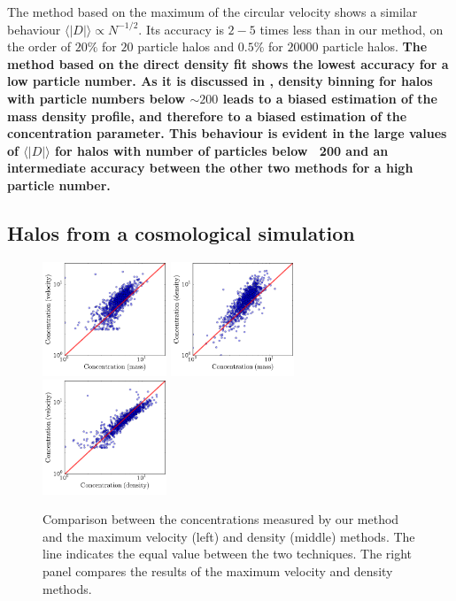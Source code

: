 \documentclass[a4,useAMS,usenatbib,usegraphicx]{mn2e}
\newcommand{\avg}[1]{\langle{#1}\rangle}
\begin{document}
The method based on the maximum of the circular velocity shows a
similar behaviour $\avg{|D|}\propto N^{-1/2}$.  Its accuracy is $2-5$
times less than in our method, on the order of $20\%$ for $20$
particle halos and $0.5\%$ for $20000$ particle halos. {\bf The method
  based on the direct density fit shows the lowest accuracy for a low
  particle number. As it is discussed in \citep{Munoz2011}, density
  binning for halos with particle numbers below $\sim200$ leads to a
  biased estimation of the mass density profile, and therefore to a
  biased estimation of the concentration parameter. This behaviour is
  evident in the large values of $\avg{|D|}$ for halos with number of
  particles below ~200 and an intermediate accuracy between the other
  two methods for a high particle number.}

\subsection{Halos from a cosmological simulation}


\label{sec:data}
\begin{figure}
  \begin{center}
    \includegraphics[width=0.33\textwidth]{conc_mass_vel.pdf}
    \includegraphics[width=0.33\textwidth]{conc_mass_dens.pdf}
    \includegraphics[width=0.33\textwidth]{conc_dens_vel.pdf}
  \end{center}
  \caption{Comparison between the concentrations measured by our
    method and the maximum velocity (left) and density (middle)
    methods. The line indicates the equal value between the two
    techniques. The right panel compares the results of the maximum
    velocity and density methods.
  \label{fig:mdv}}
\end{figure}
\end{document}
